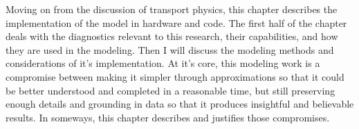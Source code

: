  Moving on from the discussion of transport physics, this chapter describes the implementation of the model in hardware and code. 
 The first half of the chapter deals with the diagnostics relevant to this research, their capabilities, and how they are used in the modeling. Then I will discuss the modeling methods and considerations of it's implementation.
 At it's core, this modeling work is a compromise between making it simpler through approximations so that it could be better understood and completed in a reasonable time, but still preserving enough details and grounding in data so that it produces insightful and believable results. In someways, this chapter describes and justifies those compromises. 

